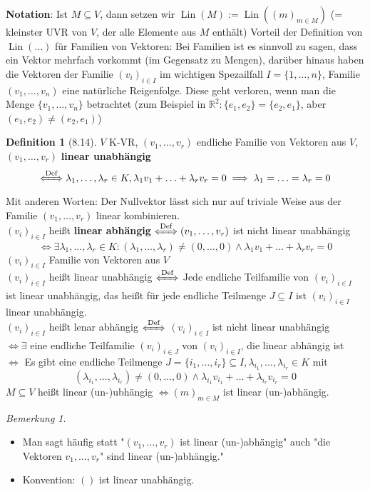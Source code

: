\documentclass[a4paper]{scrartcl}
\DeclareMathOperator{\Exists}{\exists}
\DeclareMathOperator{\Lin}{Lin}
\theoremstyle{definition}
\newtheorem{defn}{Definition}
\theoremstyle{plain}
\theoremstyle{plain}
\theoremstyle{remark}
\newtheorem{remark}{Bemerkung}
\theoremstyle{remark}
\theoremstyle{remark}
\theoremstyle{remark}
\theoremstyle{remark}
\begin{document}
\textbf{Notation}:
Ist $M\subseteq V$, dann setzen wir $\Lin(M) := \Lin((m)_{m \in M})$ (= kleinster UVR von $V$, der alle Elemente aus $M$ enthält)
Vorteil der Definition von $\Lin(\ldots)$ für Familien von Vektoren: Bei Familien ist es sinnvoll zu sagen, dass ein Vektor mehrfach vorkommt (im Gegensatz zu Mengen), darüber hinaus haben die Vektoren der Familie $(v_i)_{i \in I}$ im wichtigen Spezailfall $I = \{1,\ldots,n\}$,
Familie $(v_1, \ldots, v_n)$ eine natürliche Reigenfolge. Diese geht verloren, wenn man die Menge $\{v_1, \ldots, v_n\}$ betrachtet (zum Beispiel in $\mathbb{R}^2:\{e_1, e_2\} = \{e_2, e_1\}$, aber $(e_1, e_2) \neq (e_2, e_1)$)
\begin{defn}[8.14]
$V$ K-VR, $(v_1, \ldots, v_r)$ endliche Familie von Vektoren aus $V$, $(v_1, \ldots, v_r)$ \textbf{linear unabhängig}
\[\xLeftrightarrow{\text{Def}} \lambda_1, \ldots, \lambda_r \in K, \lambda_1 v_1 + \ldots + \lambda_r v_r = 0 \implies \lambda_1 = \ldots = \lambda_r = 0\]
Mit anderen Worten: Der Nullvektor lässt sich nur auf triviale Weise aus der Familie $(v_1, \ldots, v_r)$ linear kombinieren. \\
  $(v_i)_{i\in I}$ heißt \textbf{linear abhängig} $\xLeftrightarrow{\text{Def}} (v_1, \ldots, v_r)$ ist nicht linear unabhängig
\[\iff \Exists \lambda_1, \ldots, \lambda_r \in K: (\lambda_1, \ldots, \lambda_r) \neq (0, \ldots, 0) \wedge \lambda_1 v_1 + \ldots + \lambda_r v_r = 0\]
$(v_i)_{i\in I}$ Familie von Vektoren aus $V$ \\
  $(v_i)_{i\in I}$ heißt linear unabhängig $\xLeftrightarrow{\text{Def}}$ Jede endliche Teilfamilie von $(v_i)_{i\in I}$ ist linear unabhängig, das heißt für jede endliche Teilmenge $J\subseteq I$ ist $(v_i)_{i\in I}$ linear unabhängig. \\
  $(v_i)_{i\in I}$ heißt lenar abhängig $\xLeftrightarrow{\text{Def}}$ $(v_i)_{i\in I}$ ist nicht linear unabhängig \\
  $\iff \Exists$ eine endliche Teilfamilie $(v_i)_{i\in J}$ von $(v_i)_{i \in I}$, die linear abhängig ist \\
  $\iff$ Es gibt eine endliche Teilmenge $J = \{i_1, \ldots, i_r\} \subseteq I, \lambda_{i_1},\ldots,\lambda_{i_r} \in K$ mit
\[(\lambda_{i_1}, \ldots, \lambda_{i_r}) \neq (0, \ldots, 0) \wedge \lambda_{i_1} v_{i_1} + \ldots + \lambda_{i_r} v_{i_r} = 0\]
$M \subseteq V$ heißt linear (un-)ubhängig $\iff (m)_{m\in M}$ ist linear (un-)abhängig.
\end{defn}
\begin{remark}
\begin{itemize}
\item Man sagt häufig statt "$(v_1, \ldots, v_r)$ ist linear (un-)abhängig" auch "die Vektoren $v_1, \ldots, v_r$" sind linear (un-)abhängig."
\item Konvention: $()$ ist linear unabhängig.
\end{itemize}
\end{remark}
\end{document}
